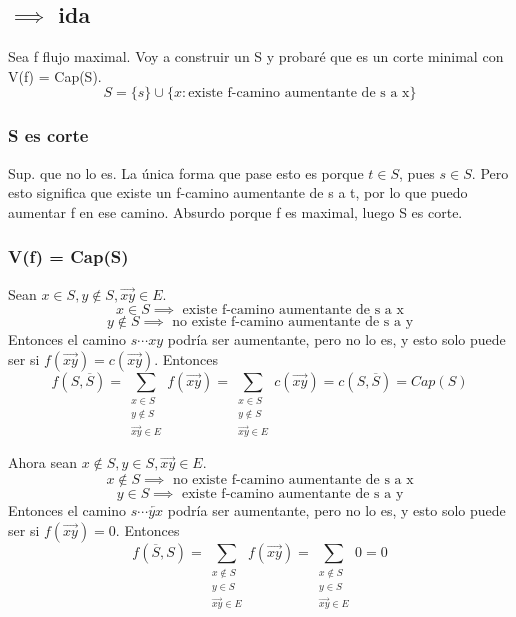 \documentclass[11pt]{article}
\begin{document}
\subsection*{\(\implies\) ida}
\label{sec:org98e83ed}
Sea f flujo maximal. Voy a construir un S y probaré que es un corte minimal con V(f) = Cap(S).
\[ S = \{s\} \cup \{x \colon \text{existe f-camino aumentante de s a x}\} \]
\subsubsection*{S es corte}
\label{sec:orgfd36bd9}
Sup. que no lo es. La única forma que pase esto es porque \(t \in S\), pues \(s \in S\). Pero esto significa que existe un f-camino aumentante de s a t, por lo que puedo aumentar f en ese camino. Absurdo porque f es maximal, luego S es corte.

\subsubsection*{V(f) = Cap(S)}
\label{sec:org4b731e7}
Sean \(x \in S, y \not\in S, \overrightarrow{xy} \in E\).
\[ x \in S \implies \text{ existe f-camino aumentante de s a x} \]
\[ y \not\in S \implies \text{ no existe f-camino aumentante de s a y} \]
Entonces el camino \(s \cdots x y\) podría ser aumentante, pero no lo es, y esto solo puede ser si \(f(\overrightarrow{xy})=c(\overrightarrow{xy})\). Entonces
\[f(S, \overline{S}) = \sum_{\substack{x \in S \\ y \not\in S \\ \overrightarrow{xy} \in E}} f(\overrightarrow{xy}) = \sum_{\substack{x \in S \\ y \not\in S \\ \overrightarrow{xy} \in E}} c(\overrightarrow{xy}) = c(S, \overline{S}) = Cap(S) \]


Ahora sean \(x \not\in S, y \in S, \overrightarrow{xy} \in E\).
\[ x \not\in S \implies \text{ no existe f-camino aumentante de s a x} \]
\[ y \in S \implies \text{ existe f-camino aumentante de s a y} \]
Entonces el camino \(s \cdots \overleftarrow{yx}\) podría ser aumentante, pero no lo es, y esto solo puede ser si \(f(\overrightarrow{xy})=0\). Entonces
\[f(\overline{S}, S) = \sum_{\substack{x \not\in S \\ y \in S \\ \overrightarrow{xy} \in E}} f(\overrightarrow{xy}) = \sum_{\substack{x \not\in S \\ y \in S \\ \overrightarrow{xy} \in E}} 0 = 0\]
\end{document}
